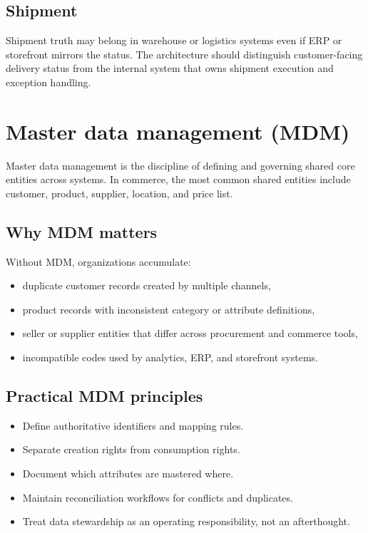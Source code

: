 \subsection{Shipment}
Shipment truth may belong in warehouse or logistics systems even if ERP or storefront mirrors the status.
The architecture should distinguish customer-facing delivery status from the internal system that owns shipment execution and exception handling.

\section{Master data management (MDM)}
Master data management is the discipline of defining and governing shared core entities across systems.
In commerce, the most common shared entities include customer, product, supplier, location, and price list.

\subsection{Why MDM matters}
Without MDM, organizations accumulate:
\begin{itemize}
  \item duplicate customer records created by multiple channels,
  \item product records with inconsistent category or attribute definitions,
  \item seller or supplier entities that differ across procurement and commerce tools,
  \item incompatible codes used by analytics, ERP, and storefront systems.
\end{itemize}

\subsection{Practical MDM principles}
\begin{itemize}
  \item Define authoritative identifiers and mapping rules.
  \item Separate creation rights from consumption rights.
  \item Document which attributes are mastered where.
  \item Maintain reconciliation workflows for conflicts and duplicates.
  \item Treat data stewardship as an operating responsibility, not an afterthought.
\end{itemize}

